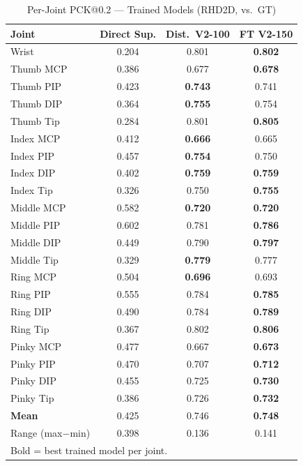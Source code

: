 \begin{table}[!t]
\caption{Per-Joint PCK@0.2 --- Trained Models (RHD2D, vs.\ GT)}
\label{tab:perjoint}
\centering
\scriptsize
\setlength{\tabcolsep}{4pt}
\renewcommand{\arraystretch}{1.05}
\begin{tabular}{lccc}
\toprule
\textbf{Joint} & \textbf{Direct Sup.} &
  \textbf{Dist.\ V2-100} & \textbf{FT V2-150} \\
\midrule
Wrist       & 0.204 & 0.801 & \textbf{0.802} \\
Thumb MCP   & 0.386 & 0.677 & \textbf{0.678} \\
Thumb PIP   & 0.423 & \textbf{0.743} & 0.741 \\
Thumb DIP   & 0.364 & \textbf{0.755} & 0.754 \\
Thumb Tip   & 0.284 & 0.801 & \textbf{0.805} \\
Index MCP   & 0.412 & \textbf{0.666} & 0.665 \\
Index PIP   & 0.457 & \textbf{0.754} & 0.750 \\
Index DIP   & 0.402 & \textbf{0.759} & \textbf{0.759} \\
Index Tip   & 0.326 & 0.750 & \textbf{0.755} \\
Middle MCP  & 0.582 & \textbf{0.720} & \textbf{0.720} \\
Middle PIP  & 0.602 & 0.781 & \textbf{0.786} \\
Middle DIP  & 0.449 & 0.790 & \textbf{0.797} \\
Middle Tip  & 0.329 & \textbf{0.779} & 0.777 \\
Ring MCP    & 0.504 & \textbf{0.696} & 0.693 \\
Ring PIP    & 0.555 & 0.784 & \textbf{0.785} \\
Ring DIP    & 0.490 & 0.784 & \textbf{0.789} \\
Ring Tip    & 0.367 & 0.802 & \textbf{0.806} \\
Pinky MCP   & 0.477 & 0.667 & \textbf{0.673} \\
Pinky PIP   & 0.470 & 0.707 & \textbf{0.712} \\
Pinky DIP   & 0.455 & 0.725 & \textbf{0.730} \\
Pinky Tip   & 0.386 & 0.726 & \textbf{0.732} \\
\midrule
\textbf{Mean}         & 0.425 & 0.746 & \textbf{0.748} \\
Range (max$-$min)     & 0.398 & 0.136 & 0.141 \\
\bottomrule
\multicolumn{4}{l}{\scriptsize Bold = best trained model per joint.}
\end{tabular}
\end{table}
